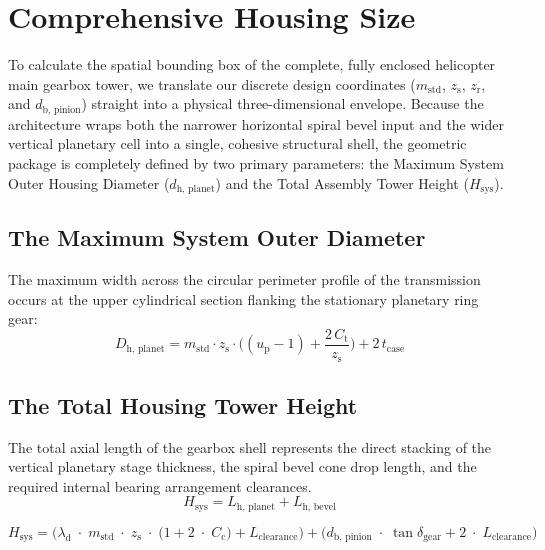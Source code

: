 \section{Comprehensive Housing Size}
    To calculate the spatial bounding box of the complete, fully enclosed helicopter main gearbox tower, 
    we translate our discrete design coordinates ($m_{\text{std}}$, $z_{\text{s}}$, $z_{\text{r}}$, and $d_{\text{b, pinion}}$) 
    straight into a physical three-dimensional envelope. Because the architecture wraps both the narrower 
    horizontal spiral bevel input and the wider vertical planetary cell into a single, cohesive structural shell, 
    the geometric package is completely defined by two primary parameters: the Maximum System 
    Outer Housing Diameter ($d_{\text{h, planet}}$) and the Total Assembly Tower Height ($H_{\text{sys}}$).

    \subsection{The Maximum System Outer Diameter}
        The maximum width across the circular perimeter profile of the transmission occurs at the 
        upper cylindrical section flanking the stationary planetary ring gear:
            \begin{equation}
                \label{eq:maxsystemouterdia}
                D_{\text{h, planet}}
                = m_{\text{std}}\!\cdot\! z_{\text{s}}\!\cdot\!
                \bigl( (u_{\text{p}}-1)
                + \frac{2\,C_{\text{t}}}{z_{\text{s}}} \bigr)
                + 2\,t_{\text{case}}
            \end{equation}

    \subsection{The Total Housing Tower Height}
        The total axial length of the gearbox shell represents the direct stacking of the vertical 
        planetary stage thickness, the spiral bevel cone drop length, and the required internal 
        bearing arrangement clearances.
            \begin{equation}
                \label{eq:totalhousingtowerheighta}
                H_{\text{sys}}
                = L_{\text{h, planet}} + L_{\text{h, bevel}}
            \end{equation}

            \begin{equation}
                \label{eq:totalhousingtowerheightb}
                H_{\text{sys}}
                = \bigl(\lambda_{\text{d}}\;\cdot\; m_{\text{std}}\;\cdot\; z_{\text{s}}
                \;\cdot\; \bigl(1 + 2\;\cdot\;C_{\text{c}}\bigr)
                +  L_{\text{clearance}}\bigr)
                + \bigl(d_{\text{b, pinion}}\;\cdot\;\tan\delta_{\text{gear}}
                + 2\;\cdot\; L_{\text{clearance}}\bigr)
            \end{equation}

